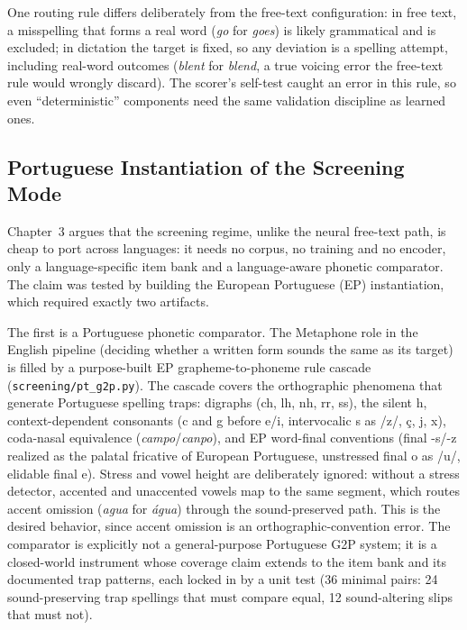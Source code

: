 One routing rule differs deliberately from the free-text configuration: in free text, a misspelling that forms a real word (\emph{go} for \emph{goes}) is likely grammatical and is excluded; in dictation the target is fixed, so any deviation is a spelling attempt, including real-word outcomes (\emph{blent} for \emph{blend}, a true voicing error the free-text rule would wrongly discard). The scorer's self-test caught an error in this rule, so even ``deterministic'' components need the same validation discipline as learned ones.

\subsection{Portuguese Instantiation of the Screening Mode}
\label{sec:impl_prototype_screening_pt}

Chapter~3 argues that the screening regime, unlike the neural free-text path, is cheap to port across languages: it needs no corpus, no training and no encoder, only a language-specific item bank and a language-aware phonetic comparator. The claim was tested by building the European Portuguese (EP) instantiation, which required exactly two artifacts.

The first is a Portuguese phonetic comparator. The Metaphone role in the English pipeline (deciding whether a written form sounds the same as its target) is filled by a purpose-built EP grapheme-to-phoneme rule cascade (\texttt{screening/pt\_g2p.py}). The cascade covers the orthographic phenomena that generate Portuguese spelling traps: digraphs (ch, lh, nh, rr, ss), the silent h, context-dependent consonants (c and g before e/i, intervocalic s as /z/, ç, j, x), coda-nasal equivalence (\emph{campo}/\emph{canpo}), and EP word-final conventions (final -s/-z realized as the palatal fricative of European Portuguese, unstressed final o as /u/, elidable final e). Stress and vowel height are deliberately ignored: without a stress detector, accented and unaccented vowels map to the same segment, which routes accent omission (\emph{agua} for \emph{água}) through the sound-preserved path. This is the desired behavior, since accent omission is an orthographic-convention error. The comparator is explicitly not a general-purpose Portuguese G2P system; it is a closed-world instrument whose coverage claim extends to the item bank and its documented trap patterns, each locked in by a unit test (36 minimal pairs: 24 sound-preserving trap spellings that must compare equal, 12 sound-altering slips that must not).

